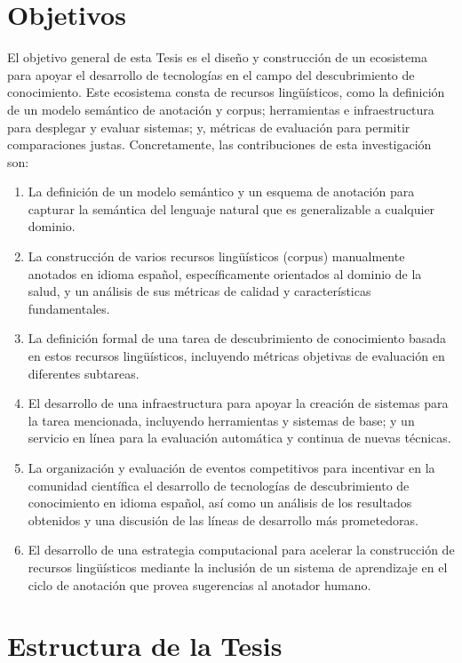 \section{Objetivos}
\label{chap1:objectives}

El objetivo general de esta Tesis es el diseño y construcción de un ecosistema para apoyar el desarrollo de tecnologías
en el campo del descubrimiento de conocimiento. Este ecosistema consta de recursos lingüísticos, como la definición de un modelo semántico de anotación y corpus; herramientas e infraestructura para desplegar y evaluar sistemas; y, métricas de evaluación para permitir comparaciones justas. Concretamente, las contribuciones de esta investigación son:
\begin{enumerate}
    \item La definición de un modelo semántico y un esquema de anotación para capturar la semántica del lenguaje natural que es generalizable a cualquier dominio.
    \item La construcción de varios recursos lingüísticos (corpus) manualmente anotados en idioma español, específicamente orientados al dominio de la salud, y un análisis de sus métricas de calidad y características fundamentales.
    \item La definición formal de una tarea de descubrimiento de conocimiento basada en estos recursos lingüísticos, incluyendo métricas objetivas de evaluación en diferentes subtareas.
    \item El desarrollo de una infraestructura para apoyar la creación de sistemas para la tarea mencionada, incluyendo herramientas y sistemas de base; y un servicio en línea para la evaluación automática y continua de nuevas técnicas.
    \item La organización y evaluación de eventos competitivos para incentivar en la comunidad científica el desarrollo de tecnologías de descubrimiento de conocimiento en idioma español, así como un análisis de los resultados obtenidos y una discusión de las líneas de desarrollo más prometedoras.
    \item El desarrollo de una estrategia computacional para acelerar la construcción de recursos lingüísticos mediante la inclusión de un sistema de aprendizaje en el ciclo de anotación que provea sugerencias al anotador humano.
\end{enumerate}

\section{Estructura de la Tesis}
\label{chap1:thesis-structure}

